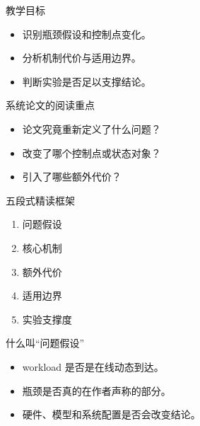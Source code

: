 




\begin{frame}[plain]
  \titlepage
\end{frame}

\begin{frame}{教学目标}
  \begin{itemize}
    \item 识别瓶颈假设和控制点变化。
    \item 分析机制代价与适用边界。
    \item 判断实验是否足以支撑结论。
  \end{itemize}
\end{frame}

\begin{frame}{系统论文的阅读重点}
  \begin{itemize}
    \item 论文究竟重新定义了什么问题？
    \item 改变了哪个控制点或状态对象？
    \item 引入了哪些额外代价？
  \end{itemize}
\end{frame}

\begin{frame}{五段式精读框架}
  \begin{enumerate}
    \item 问题假设
    \item 核心机制
    \item 额外代价
    \item 适用边界
    \item 实验支撑度
  \end{enumerate}
\end{frame}

\begin{frame}{什么叫“问题假设”}
  \begin{itemize}
    \item workload 是否是在线动态到达。
    \item 瓶颈是否真的在作者声称的部分。
    \item 硬件、模型和系统配置是否会改变结论。
  \end{itemize}
\end{frame}

